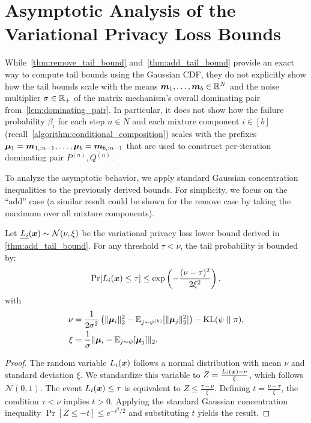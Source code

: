 \clearpage

\iffalse
\section{Asymptotic Analysis of the Variational Privacy Loss Bounds}

While~\cref{thm:remove_tail_bound} and~\cref{thm:add_tail_bound} provide an exact way to compute tail bounds using the Gaussian CDF, they do not explicitly show how the tail bounds scale with the means ${\bm{m}}_1,\dots, {\bm{m}}_b \in {\mathbb{R}}^{N}$ and the noise multiplier $\sigma \in {\mathbb{R}}_+$ of the matrix mechanism's overall dominating pair from~\cref{lem:dominating_pair}.
In particular, it does not show how the failure probability $\beta_i$ for each step $n \in N$ and each mixture component $i \in [b]$ (recall~\cref{algorithm:conditional_composition})
scales with the prefixes ${\bm{\mu}}_1 = {\bm{m}}_{1,:n-1}, \dots, {\bm{\mu}}_b = {\bm{m}}_{b,:n-1}$
that are used to construct per-iteration dominating pair $P^{(n)},Q^{(n)}$.


To analyze the asymptotic behavior, we apply standard Gaussian concentration inequalities to the previously derived bounds. For simplicity, we focus on the ``add'' case (a similar result could be shown for the remove case by taking the maximum over all mixture components).
\begin{proposition}\label{prop:asymptotic_bound}
    Let $\underline{L_i}({\bm{x}}) \sim \mathcal{N}(\nu, \xi)$ be the variational privacy loss lower bound derived in \cref{thm:add_tail_bound}. For any threshold $\tau < \nu$, the tail probability is bounded by:
    \begin{equation}
        \Pr[L_i({\bm{x}}) \leq \tau] \leq \exp\left( - \frac{(\nu - \tau)^2}{2\xi^2} \right),
    \end{equation}
    with
    \begin{align*}
        \nu &= \frac{1}{2\sigma^2} \left( \|{\bm{\mu}}_i\|_2^2 - \mathbb{E}_{j \sim \psi^{(k)}}[\|{\bm{\mu}}_j\|_2^2] \right) - \mathrm{KL}(\psi \mid\mid \pi), \\
        \xi &= \frac{1}{\sigma} \| {\bm{\mu}}_i - \mathbb{E}_{j \sim \psi}[{\bm{\mu}}_j] \|_2.
    \end{align*}
\end{proposition}

\begin{proof}
    The random variable $L_i({\bm{x}})$ follows a normal distribution with mean $\nu$ and standard deviation $\xi$. We standardize this variable to $Z = \frac{L_i({\bm{x}}) - \nu}{\xi}$, which follows $\mathcal{N}(0, 1)$.
    The event $L_i({\bm{x}}) \leq \tau$ is equivalent to $Z \leq \frac{\tau - \nu}{\xi}$. Defining $t = \frac{\nu - \tau}{\xi}$, the condition $\tau < \nu$ implies $t > 0$.
    Applying the standard Gaussian concentration inequality $\Pr[Z \leq -t] \leq e^{-t^2/2}$ and substituting $t$ yields the result.
\end{proof}

